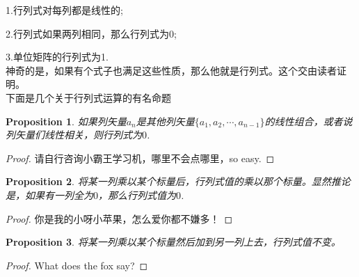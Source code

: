 \documentclass[11pt,a4paper,openany]{book}%
\theoremstyle{plain}%
\newtheorem{pro}{Proposition}[chapter]%
\begin{document}
1.行列式对每列都是线性的;

2.行列式如果两列相同，那么行列式为0;

3.单位矩阵的行列式为1.\\
神奇的是，如果有个式子也满足这些性质，那么他就是行列式。这个交由读者证明。\\
下面是几个关于行列式运算的有名命题
\begin{pro}
\label{行列式性质1}
如果列矢量$a_n$是其他列矢量$\{a_1,a_2,\cdots,a_{n-1}\}$的线性组合，或者说列矢量们线性相关，则行列式为$0$.
\end{pro}
\begin{proof}
请自行咨询小霸王学习机，哪里不会点哪里，so easy.
\end{proof}
\begin{pro}
\label{行列式性质2}
将某一列乘以某个标量后，行列式值的乘以那个标量。显然推论是，如果有一列全为$0$，那么行列式值为$0$.
\end{pro}
\begin{proof}
你是我的小呀小苹果，怎么爱你都不嫌多！
\end{proof}
\begin{pro}
\label{行列式性质3}
将某一列乘以某个标量然后加到另一列上去，行列式值不变。
\end{pro}
\begin{proof}
What does the fox say?
\end{proof}
\end{document}
